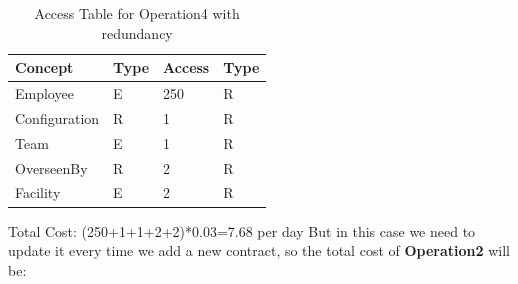 \begin{table}[H]
    \renewcommand{\arraystretch}{1.3} %
    \begin{tabularx}{\textwidth}{|X|X|X|X|}
    \hline
    \textbf{Concept}& \textbf{Type}  & \textbf{Access}    & \textbf{Type}     \\ \hline
    Employee & E & 250 & R \\ \hline
    Configuration & R & 1 & R \\ \hline
    Team & E & 1 & R \\ \hline
    OverseenBy & R & 2 & R \\ \hline
    Facility & E & 2 & R \\ \hline
    \end{tabularx}
    \caption{Access Table for Operation4 with redundancy}
\end{table}
\noindent Total Cost: (250+1+1+2+2)*0.03=7.68 per day
\newline
\noindent But in this case we need to update it every time we add a new contract, so the total cost of \textbf{Operation2} will be:

